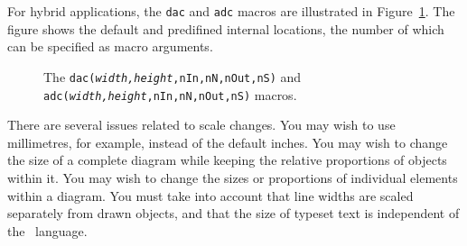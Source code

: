 For hybrid applications, the \verb|dac| and \verb|adc| macros are
illustrated in Figure~\ref{Dac}.
The figure shows the default and predifined internal locations, the number
of which can be specified as macro arguments.
\begin{figure}[ht]
   
   \caption{The {\tt dac({\sl width,height},nIn,nN,nOut,nS)}
   and {\tt adc({\sl width,height},nIn,nN,nOut,nS)} macros.}
   \label{Dac}
   \end{figure}

\iffalse
A good strategy for drawing complex logic circuits might be summarized
as follows:
\begin{itemize}
\item Establish the absolute locations of gates and other major components
  (e.g.\ chips) relative to a grid of mesh size commensurate with
  {\tt L\_unit}, which is an absolute length.
\item Draw minor components or blocks relative to the major ones, using
   parametrized relative distances.
\item Draw connecting lines relative to the components and previously drawn
   lines.
\item Write macros for repeated objects.
\item Tune the diagram by making absolute locations relative, and by tuning
   the parameters.
   Some useful macros for this are the following, which are in units of
  {\tt L\_unit}:
   \begin{itemize}
   \item[] {\tt AND\_ht, AND\_wd}: the height and width of basic AND and
     OR gates
   \item[] {\tt BUF\_ht, BUF\_wd}: the height and width of basic buffers
   \item[] {\tt N\_diam}: the diameter of NOT circles
   \end{itemize}
   \end{itemize}
In addition to the logic gates described here, some experimental
IC chip diagrams are included with the distributed example files.
\fi


\label{scaling:}

There are several issues related to scale changes.  You may wish to use
millimetres, for example, instead of the default inches.  You may wish
to change the size of a complete diagram while keeping the relative
proportions of objects within it.  You may wish to change the sizes or
proportions of individual elements within a diagram.  You must take
into account that line widths are scaled separately from drawn objects,
and that the size of typeset text is independent of the \pic\ language.

